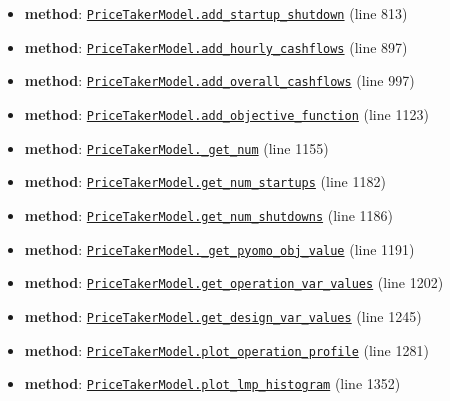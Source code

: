 \documentclass[11pt]{report}
\begin{document}
\begin{itemize}[leftmargin=*]
  \item \textbf{method}: \hyperref[def:pricetaker-price_taker_model.py:PriceTakerModel.add_startup_shutdown:L813]{\texttt{PriceTakerModel.add\_startup\_shutdown}} (line 813)
  \item \textbf{method}: \hyperref[def:pricetaker-price_taker_model.py:PriceTakerModel.add_hourly_cashflows:L897]{\texttt{PriceTakerModel.add\_hourly\_cashflows}} (line 897)
  \item \textbf{method}: \hyperref[def:pricetaker-price_taker_model.py:PriceTakerModel.add_overall_cashflows:L997]{\texttt{PriceTakerModel.add\_overall\_cashflows}} (line 997)
  \item \textbf{method}: \hyperref[def:pricetaker-price_taker_model.py:PriceTakerModel.add_objective_function:L1123]{\texttt{PriceTakerModel.add\_objective\_function}} (line 1123)
  \item \textbf{method}: \hyperref[def:pricetaker-price_taker_model.py:PriceTakerModel._get_num:L1155]{\texttt{PriceTakerModel.\_get\_num}} (line 1155)
  \item \textbf{method}: \hyperref[def:pricetaker-price_taker_model.py:PriceTakerModel.get_num_startups:L1182]{\texttt{PriceTakerModel.get\_num\_startups}} (line 1182)
  \item \textbf{method}: \hyperref[def:pricetaker-price_taker_model.py:PriceTakerModel.get_num_shutdowns:L1186]{\texttt{PriceTakerModel.get\_num\_shutdowns}} (line 1186)
  \item \textbf{method}: \hyperref[def:pricetaker-price_taker_model.py:PriceTakerModel._get_pyomo_obj_value:L1191]{\texttt{PriceTakerModel.\_get\_pyomo\_obj\_value}} (line 1191)
  \item \textbf{method}: \hyperref[def:pricetaker-price_taker_model.py:PriceTakerModel.get_operation_var_values:L1202]{\texttt{PriceTakerModel.get\_operation\_var\_values}} (line 1202)
  \item \textbf{method}: \hyperref[def:pricetaker-price_taker_model.py:PriceTakerModel.get_design_var_values:L1245]{\texttt{PriceTakerModel.get\_design\_var\_values}} (line 1245)
  \item \textbf{method}: \hyperref[def:pricetaker-price_taker_model.py:PriceTakerModel.plot_operation_profile:L1281]{\texttt{PriceTakerModel.plot\_operation\_profile}} (line 1281)
  \item \textbf{method}: \hyperref[def:pricetaker-price_taker_model.py:PriceTakerModel.plot_lmp_histogram:L1352]{\texttt{PriceTakerModel.plot\_lmp\_histogram}} (line 1352)
\end{itemize}
\end{document}
